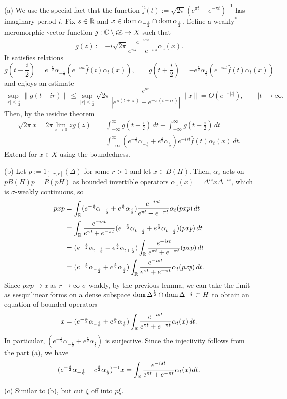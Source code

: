 \documentclass{../../small}
\begin{document}
\begin{pf}
(a)
We use the special fact that the function $\hat f(t):=\sqrt{2\pi}(e^{\pi t}+e^{-\pi t})^{-1}$ has imaginary period $i$.
Fix $s\in\mathbb{R}$ and $x\in\operatorname{dom}\alpha_{-\frac i2}\cap\operatorname{dom}\alpha_{\frac i2}$.
Define a weakly$^*$ meromorphic vector function $g:\mathbb{C}\setminus i\mathbb{Z}\to X$ such that
\[g(z):=-i\sqrt{2\pi}\frac{e^{-isz}}{e^{\pi z}-e^{-\pi z}}\alpha_z(x).\]
It satisfies relations
\[g(t-\frac i2)=e^{-\frac s2}\alpha_{-\frac i2}(e^{-ist}\hat f(t)\alpha_t(x)),\qquad
g(t+\frac i2)=-e^{\frac s2}\alpha_{\frac i2}(e^{-ist}\hat f(t)\alpha_t(x))\]
and enjoys an estimate
\[\sup_{|r|\le\frac12}\|g(t+ir)\|\le\sup_{|r|\le\frac12}\sqrt{2\pi}\frac{e^{sr}}{|e^{\pi(t+ir)}-e^{-\pi(t+ir)}|}\|x\|=O(e^{-\pi|t|}),\qquad|t|\to\infty.\]
Then, by the residue theorem
\begin{align*}
\sqrt{2\pi}x=2\pi\lim_{z\to0}zg(z)
&=\int_{-\infty}^\infty g(t-\frac i2)\,dt-\int_{-\infty}^\infty g(t+\frac i2)\,dt\\
&=\int_{-\infty}^\infty(e^{-\frac s2}\alpha_{-\frac i2}+e^{\frac s2}\alpha_{\frac i2})e^{-ist}\hat f(t)\alpha_t(x)\,dt.
\end{align*}
Extend for $x\in X$ using the boundedness.

(b)
Let $p:=1_{[-r,r]}(\Delta)$ for some $r>1$ and let $x\in B(H)$.
Then, $\alpha_z$ acts on $pB(H)p=B(pH)$ as bounded invertible operators $\alpha_z(x)=\Delta^{iz}x\Delta^{-iz}$, which is $\sigma$-weakly continuous, so
\begin{align*}
pxp&=\int_{\mathbb{R}}(e^{-\frac s2}\alpha_{-\frac i2}+e^{\frac s2}\alpha_{\frac i2})\frac{e^{-ist}}{e^{\pi t}+e^{-\pi t}}\alpha_t(pxp)\,dt\\
&=\int_{\mathbb{R}}\frac{e^{-ist}}{e^{\pi t}+e^{-\pi t}}(e^{-\frac s2}\alpha_{t-\frac i2}+e^{\frac s2}\alpha_{t+\frac i2})(pxp)\,dt\\
&=(e^{-\frac s2}\alpha_{t-\frac i2}+e^{\frac s2}\alpha_{t+\frac i2})\int_{\mathbb{R}}\frac{e^{-ist}}{e^{\pi t}+e^{-\pi t}}(pxp)\,dt\\
&=(e^{-\frac s2}\alpha_{-\frac i2}+e^{\frac s2}\alpha_{\frac i2})\int_{\mathbb{R}}\frac{e^{-ist}}{e^{\pi t}+e^{-\pi t}}\alpha_t(pxp)\,dt.
\end{align*}
Since $pxp\to x$ as $r\to\infty$ $\sigma$-weakly, by the previous lemma, we can take the limit as sesquilinear forms on a dense subspace $\operatorname{dom}\Delta^{\frac12}\cap\operatorname{dom}\Delta^{-\frac12}\subset H$ to obtain an equation of bounded operators
\[x=(e^{-\frac s2}\alpha_{-\frac i2}+e^{\frac s2}\alpha_{\frac i2})\int_{\mathbb{R}}\frac{e^{-ist}}{e^{\pi t}+e^{-\pi t}}\alpha_t(x)\,dt.\]
In particular, $(e^{-\frac s2}\alpha_{-\frac i2}+e^{\frac s2}\alpha_{\frac i2})$ is surjective.
Since the injectivity follows from the part (a), we have
\[(e^{-\frac s2}\alpha_{-\frac i2}+e^{\frac s2}\alpha_{\frac i2})^{-1}x=\int_{\mathbb{R}}\frac{e^{-ist}}{e^{\pi t}+e^{-\pi t}}\alpha_t(x)\,dt.\]

(c)
Similar to (b), but cut $\xi$ off into $p\xi$.
\end{pf}
\end{document}
